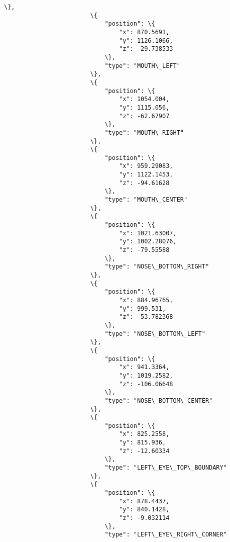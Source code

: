 \documentclass[11pt]{article}
\begin{document}
\begin{Verbatim}[commandchars=\\\{\}]
                        \},
                        \{
                            "position": \{
                                "x": 870.5691,
                                "y": 1126.1066,
                                "z": -29.738533
                            \},
                            "type": "MOUTH\_LEFT"
                        \},
                        \{
                            "position": \{
                                "x": 1054.004,
                                "y": 1115.056,
                                "z": -62.67907
                            \},
                            "type": "MOUTH\_RIGHT"
                        \},
                        \{
                            "position": \{
                                "x": 959.29083,
                                "y": 1122.1453,
                                "z": -94.61628
                            \},
                            "type": "MOUTH\_CENTER"
                        \},
                        \{
                            "position": \{
                                "x": 1021.63007,
                                "y": 1002.28076,
                                "z": -79.55588
                            \},
                            "type": "NOSE\_BOTTOM\_RIGHT"
                        \},
                        \{
                            "position": \{
                                "x": 884.96765,
                                "y": 999.531,
                                "z": -53.782368
                            \},
                            "type": "NOSE\_BOTTOM\_LEFT"
                        \},
                        \{
                            "position": \{
                                "x": 941.3364,
                                "y": 1019.2582,
                                "z": -106.06648
                            \},
                            "type": "NOSE\_BOTTOM\_CENTER"
                        \},
                        \{
                            "position": \{
                                "x": 825.2558,
                                "y": 815.936,
                                "z": -12.60334
                            \},
                            "type": "LEFT\_EYE\_TOP\_BOUNDARY"
                        \},
                        \{
                            "position": \{
                                "x": 878.4437,
                                "y": 840.1428,
                                "z": -9.032114
                            \},
                            "type": "LEFT\_EYE\_RIGHT\_CORNER"

\end{Verbatim}
\end{document}
